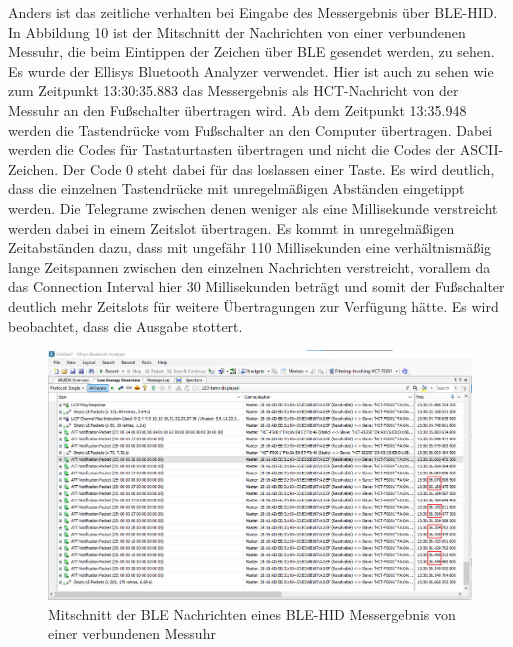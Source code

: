Anders ist das zeitliche verhalten bei Eingabe des Messergebnis über BLE-HID. In Abbildung 10 ist der Mitschnitt der Nachrichten von einer verbundenen Messuhr, die beim Eintippen der Zeichen über BLE gesendet werden, zu sehen. Es wurde der Ellisys Bluetooth Analyzer verwendet. Hier ist auch zu sehen wie zum Zeitpunkt 13:30:35.883 das Messergebnis als HCT-Nachricht von der Messuhr an den Fußschalter übertragen wird. Ab dem Zeitpunkt 13:35.948 werden die Tastendrücke vom Fußschalter an den Computer übertragen. Dabei werden die Codes für Tastaturtasten übertragen und nicht die Codes der ASCII-Zeichen. Der Code 0 steht dabei für das loslassen einer Taste. Es wird deutlich, dass die einzelnen Tastendrücke mit unregelmäßigen Abständen eingetippt werden. Die Telegrame zwischen denen weniger als eine Millisekunde verstreicht werden dabei in einem Zeitslot übertragen. Es kommt in unregelmäßigen Zeitabständen dazu, dass mit ungefähr 110 Millisekunden eine verhältnismäßig lange Zeitspannen zwischen den einzelnen Nachrichten verstreicht, vorallem da das Connection Interval hier 30 Millisekunden beträgt und somit der Fußschalter deutlich mehr Zeitslots für weitere Übertragungen zur Verfügung hätte. Es wird beobachtet, dass die Ausgabe stottert.
\begin{figure}[H] 
	\centering
	\includegraphics[width=\textwidth]{figures/BLEHID1device.png}
	\caption{Mitschnitt der BLE Nachrichten eines BLE-HID Messergebnis von einer verbundenen Messuhr}
\end{figure}

